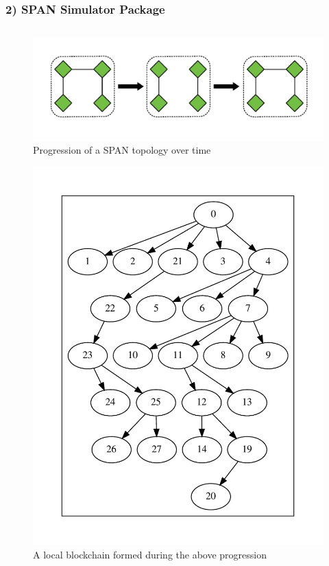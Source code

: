 \documentclass{beamer}
\begin{document}
\begin{frame}
	\frametitle{2) SPAN Simulator Package}

	\begin{columns}
		\begin{column}{0.3\textwidth}
			\centering
			\begin{figure}
				\includegraphics[width=\textwidth]{horseshoe.pdf}
				\caption{Progression of a SPAN topology over time}
			\end{figure}

			\vspace{-1cm}

			\begin{figure}
				\includegraphics[width=\textwidth]{horseshoe_0.pdf}
				\caption{A local blockchain formed during the above
				progression}
			\end{figure}
		\end{column}


\end{columns}
\end{frame}
\end{document}
